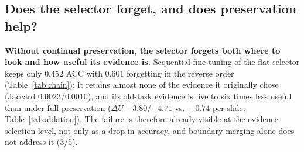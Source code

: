 \documentclass{article}
\begin{document}
\subsection{Does the selector forget, and does preservation help?}
\label{ssec:ablation}

\begin{table}[!htb]
\centering\footnotesize\renewcommand{\arraystretch}{0.92}
\setlength{\tabcolsep}{4pt}
\caption{\textbf{Leave-out chain in both task orders} (TCGA continual WSI benchmark, ten-fold CV; ACC mean$\pm$sd, forgetting mean). Reverse = ESCA$\rightarrow$RCC$\rightarrow$BRCA$\rightarrow$LUNG; forward = the opposite. The zero-shot reference selects the eight patches with the highest class-text cosine, pools them uniformly, and uses the frozen head; it learns nothing. Last two rows: the strongest published method, as reported in \cite{gou2025qpmil} and as rerun by us with its released code.}
\label{tab:chain}
\end{table}

\textbf{Without continual preservation, the selector forgets both where to look and how useful its evidence is.} Sequential fine-tuning of the flat selector keeps only $0.452$ ACC with $0.601$ forgetting in the reverse order (Table~\ref{tab:chain}); it retains almost none of the evidence it originally chose (Jaccard $0.0023$/$0.0010$), and its old-task evidence is five to six times less useful than under full preservation ($\Delta U$ $-3.80$/$-4.71$ vs.\ $-0.74$ per slide; Table~\ref{tab:ablation}). The failure is therefore already visible at the evidence-selection level, not only as a drop in accuracy, and boundary merging alone does not address it (3/5).
\end{document}
